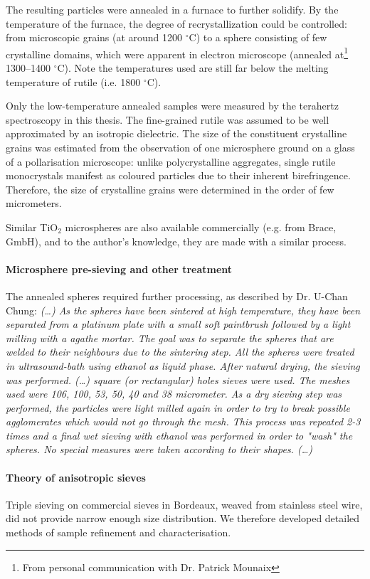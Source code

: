 The resulting particles were annealed in a furnace to further solidify. By the temperature of the furnace, the degree of recrystallization could be controlled: from microscopic grains (at around 1200  $^{\circ}$C) to a sphere consisting of few crystalline domains, which were apparent in electron microscope (annealed at\footnote{From personal communication with Dr. Patrick Mounaix} 1300--1400 $^{\circ}$C). Note the temperatures used are still far below the melting temperature of rutile (i.e. 1800 $^{\circ}$C).

Only the low-temperature annealed samples were measured by the terahertz spectroscopy in this thesis. The fine-grained rutile was assumed to be well approximated by an isotropic dielectric. The size of the constituent crystalline grains was estimated from the observation of one microsphere ground on a glass of a pollarisation microscope: unlike polycrystalline aggregates, single rutile monocrystals manifest as coloured particles due to their inherent birefringence. Therefore, the size of crystalline grains were determined in the order of few micrometers.

Similar TiO$_{2}$ microspheres are also available commercially (e.g. from Brace, GmbH), and to the author's knowledge, they are made with a similar process.

\paragraph{Microsphere pre-sieving and other treatment}
The annealed spheres required further processing, as described by {Dr.} U-Chan Chung: 
\textit{
(\ldots) As the spheres have been sintered at high temperature, they have been separated from a platinum plate with a small soft paintbrush followed by a light milling with a agathe mortar. The goal was to separate the spheres that are welded to their neighbours due to the sintering step. All the spheres were treated in ultrasound-bath using ethanol as liquid phase. After natural drying, the sieving was performed. (\ldots) square (or rectangular) holes sieves were used. The meshes used were 106, 100, 53, 50, 40 and 38 micrometer. As a dry sieving step was performed, the particles were light milled again in order to try to break possible agglomerates which would not go through the mesh. This process was repeated 2-3 times and a final wet sieving with ethanol was performed in order to "wash" the spheres. No special measures were taken according to their shapes. (\ldots) } 

\paragraph{Theory of anisotropic sieves}
Triple sieving on commercial sieves in Bordeaux, weaved from stainless steel wire, did not provide narrow enough size distribution. We therefore developed detailed methods of sample refinement and characterisation. 

